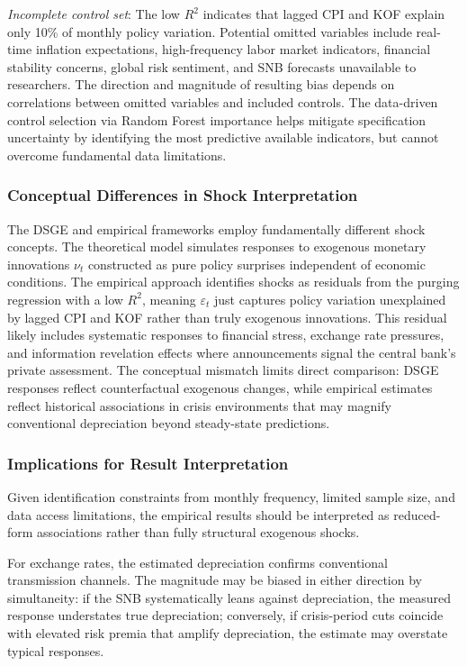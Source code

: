 \documentclass[12pt,a4paper]{article}
\begin{document}
\textit{Incomplete control set}: The low $R^2$ indicates that lagged CPI and KOF explain only 10\% of monthly policy variation. Potential omitted variables include real-time inflation expectations, high-frequency labor market indicators, financial stability concerns, global risk sentiment, and SNB forecasts unavailable to researchers. The direction and magnitude of resulting bias depends on correlations between omitted variables and included controls. The data-driven control selection via Random Forest importance helps mitigate specification uncertainty by identifying the most predictive available indicators, but cannot overcome fundamental data limitations.

\subsubsection{Conceptual Differences in Shock Interpretation}
The DSGE and empirical frameworks employ fundamentally different shock concepts. The theoretical model simulates responses to exogenous monetary innovations $\nu_t$ constructed as pure policy surprises independent of economic conditions. The empirical approach identifies shocks as residuals from the purging regression with a low $R^2$, meaning $\varepsilon_t$ just captures policy variation unexplained by lagged CPI and KOF rather than truly exogenous innovations. This residual likely includes systematic responses to financial stress, exchange rate pressures, and information revelation effects where announcements signal the central bank's private assessment. The conceptual mismatch limits direct comparison: DSGE responses reflect counterfactual exogenous changes, while empirical estimates reflect historical associations in crisis environments that may magnify conventional depreciation beyond steady-state predictions.

\subsubsection{Implications for Result Interpretation}

Given identification constraints from monthly frequency, limited sample size, and data access limitations, the empirical results should be interpreted as reduced-form associations rather than fully structural exogenous shocks.


For exchange rates, the estimated depreciation confirms conventional transmission channels. The magnitude may be biased in either direction by simultaneity: if the SNB systematically leans against depreciation, the measured response understates true depreciation; conversely, if crisis-period cuts coincide with elevated risk premia that amplify depreciation, the estimate may overstate typical responses. 
\end{document}
